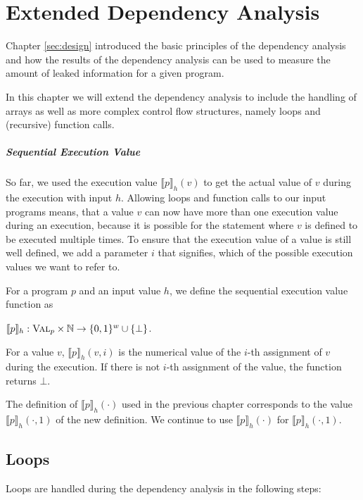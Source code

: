 \chapter{Extended Dependency Analysis}\label{ch:loops}

Chapter \ref{sec:design} introduced the basic principles of the dependency analysis and how the results of the dependency analysis can be used to measure the amount of leaked information for a given program.

In this chapter we will extend the dependency analysis to include the handling of arrays as well as more complex control flow structures, namely loops and (recursive) function calls.

\paragraph{Sequential Execution Value}
So far, we used the execution value $\llbracket p \rrbracket_h (v)$ to get the actual value of $v$ during the execution with input $h$. Allowing loops and function calls to our input programs means, that a value $v$ can now have more than one execution value during an execution, because it is possible for the statement where $v$ is defined to be executed multiple times.
To ensure that the execution value of a value is still well defined, we add a parameter $i$ that signifies, which of the possible execution values we want to refer to.

\begin{definition}
    For a program $p$ and an input value $h$, we define the sequential execution value function as
    \begin{center}
        $\llbracket p \rrbracket_h: \textsc{Val}_p \times \mathbb{N} \to \{0, 1\} ^w \cup \{\bot\}$.
    \end{center}
    For a value $v$, $\llbracket p \rrbracket_h(v, i)$ is the numerical value of the $i$-th assignment of $v$ during the execution. If there is not $i$-th assignment of the value, the function returns $\bot$.
\end{definition}
The definition of $\llbracket p \rrbracket_h(\cdot)$ used in the previous chapter corresponds to the value $\llbracket p \rrbracket_h (\cdot, 1)$ of the new definition. We continue to use $\llbracket p \rrbracket_h(\cdot)$ for $\llbracket p \rrbracket_h (\cdot, 1)$. 

\section{Loops}
Loops are handled during the dependency analysis in the following steps:

